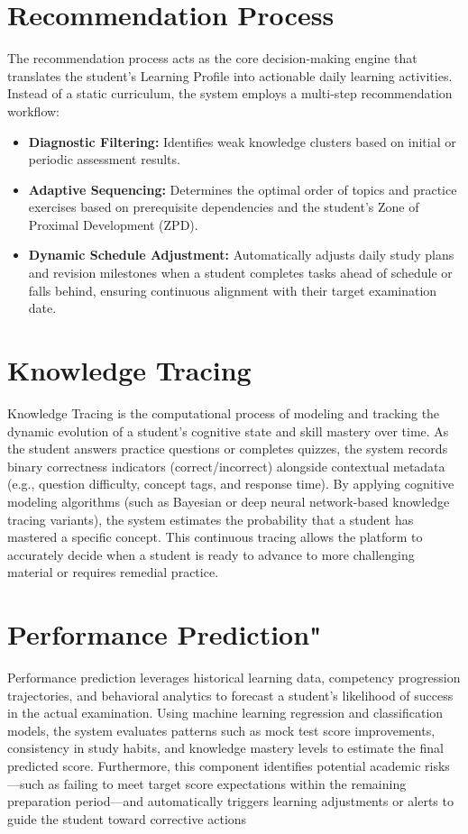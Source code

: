 \section{Recommendation Process}

The recommendation process acts as the core decision-making engine that translates the student's Learning Profile into actionable daily learning activities. Instead of a static curriculum, the system employs a multi-step recommendation workflow:

\begin{itemize}
	\item \textbf{Diagnostic Filtering:} Identifies weak knowledge clusters based on initial or periodic assessment results.
	\item \textbf{Adaptive Sequencing:} Determines the optimal order of topics and practice exercises based on prerequisite dependencies and the student's Zone of Proximal Development (ZPD).
	\item \textbf{Dynamic Schedule Adjustment:} Automatically adjusts daily study plans and revision milestones when a student completes tasks ahead of schedule or falls behind, ensuring continuous alignment with their target examination date.
\end{itemize}

\section{Knowledge Tracing}

Knowledge Tracing is the computational process of modeling and tracking the dynamic evolution of a student's cognitive state and skill mastery over time. As the student answers practice questions or completes quizzes, the system records binary correctness indicators (correct/incorrect) alongside contextual metadata (e.g., question difficulty, concept tags, and response time). By applying cognitive modeling algorithms (such as Bayesian or deep neural network-based knowledge tracing variants), the system estimates the probability that a student has mastered a specific concept. This continuous tracing allows the platform to accurately decide when a student is ready to advance to more challenging material or requires remedial practice.

\section{Performance Prediction"}

Performance prediction leverages historical learning data, competency progression trajectories, and behavioral analytics to forecast a student's likelihood of success in the actual examination. Using machine learning regression and classification models, the system evaluates patterns such as mock test score improvements, consistency in study habits, and knowledge mastery levels to estimate the final predicted score. Furthermore, this component identifies potential academic risks---such as failing to meet target score expectations within the remaining preparation period---and automatically triggers learning adjustments or alerts to guide the student toward corrective actions

